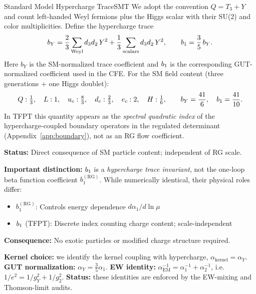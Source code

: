 \begin{axiom}{Standard Model Hypercharge Trace}{SMT}
We adopt the convention $Q=T_3+Y$ and count left-handed Weyl fermions plus the Higgs
scalar with their SU(2) and color multiplicities. Define the hypercharge trace
\begin{equation}
    b_Y = \frac{2}{3}\sum_{\text{Weyl}} d_3 d_2\,Y^2
    + \frac{1}{3}\sum_{\text{scalars}} d_3 d_2\,Y^2,
    \qquad
    b_1 = \frac{3}{5}\,b_Y.
\end{equation}
Here $b_Y$ is the SM-normalized trace coefficient and $b_1$ is the corresponding
GUT-normalized coefficient used in the CFE.
For the SM field content (three generations + one Higgs doublet):
\begin{equation}
    Q:\tfrac{1}{3},\quad L:1,\quad u_c:\tfrac{8}{3},\quad d_c:\tfrac{2}{3},\quad e_c:2,\quad H:\tfrac{1}{6},
    \qquad b_Y=\frac{41}{6},\quad b_1=\frac{41}{10}.
\end{equation}
In TFPT this quantity appears as the \emph{spectral quadratic index} of the
hypercharge-coupled boundary operators in the regulated determinant
(Appendix~\ref{app:boundary}), not as an RG flow coefficient.

\tcblower
\textbf{Status:} Direct consequence of SM particle content; independent of RG scale.

\textbf{Important distinction:} $b_1$ is a \emph{hypercharge trace invariant}, 
not the one-loop beta function coefficient $b_1^{(\text{RG})}$. While numerically 
identical, their physical roles differ:
\begin{itemize}[leftmargin=1.5em, topsep=2pt, itemsep=1pt]
    \item $b_1^{(\text{RG})}$: Controls energy dependence $d\alpha_1/d\ln\mu$
    \item $b_1$ (TFPT): Discrete index counting charge content; scale-independent
\end{itemize}

\textbf{Consequence:} No exotic particles or modified charge structure required.
\end{axiom}

\begin{tcolorbox}[colback=yellow!3, colframe=yellow!60!black,
    title={\textbf{EW mapping (kernel $\alpha$ vs. observable $\alpha_{\mathrm{EM}}$)}}, fonttitle=\bfseries\small]
\textbf{Kernel choice:} we identify the kernel coupling with hypercharge, $\alpha_{\mathrm{kernel}}=\alpha_Y$.
\textbf{GUT normalization:} $\alpha_Y = \tfrac{3}{5}\alpha_1$.
\textbf{EW identity:} $\alpha_{\mathrm{EM}}^{-1} = \alpha_1^{-1} + \alpha_2^{-1}$, i.e.\ $1/e^2=1/g_Y^2+1/g_2^2$.
\textbf{Status:} these identities are enforced by the EW-mixing and Thomson-limit audits.
\end{tcolorbox}

